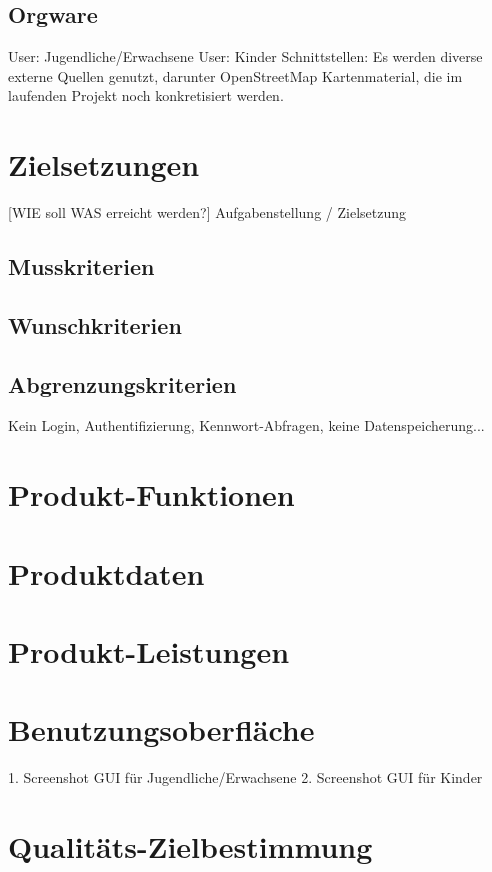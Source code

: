 \documentclass[10pt]{report}
\begin{document}
\section{Orgware}
User: Jugendliche/Erwachsene
User: Kinder
Schnittstellen: Es  werden  diverse  externe  Quellen genutzt, darunter OpenStreetMap Kartenmaterial, die im laufenden Projekt noch konkretisiert werden.


\chapter{Zielsetzungen}
[WIE soll WAS erreicht werden?]
Aufgabenstellung / Zielsetzung

\section{Musskriterien}
\section{Wunschkriterien}
\section{Abgrenzungskriterien}
Kein Login, Authentifizierung, Kennwort-Abfragen, keine Datenspeicherung...



\chapter{Produkt-Funktionen}

\chapter{Produktdaten}

\chapter{Produkt-Leistungen}

\chapter{Benutzungsoberfläche}
1. Screenshot GUI für Jugendliche/Erwachsene
2. Screenshot GUI für Kinder

\chapter{Qualitäts-Zielbestimmung}
\end{document}
